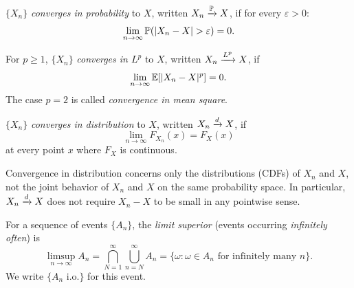 \documentclass[11pt,a4paper]{article}
\begin{document}
\begin{definition}
\label{def:prob_conv}
$\{X_n\}$ \emph{converges in probability} to $X$, written
$X_n \xrightarrow{\mathbb{P}} X$, if for every $\varepsilon > 0$:
\begin{equation}
  \lim_{n \to \infty} \mathbb{P}(|X_n - X| > \varepsilon) = 0.
  \label{eq:prob_conv}
\end{equation}
\end{definition}

\begin{definition}[Convergence in $L^p$]
\label{def:lp_conv}
For $p \geq 1$, $\{X_n\}$ \emph{converges in $L^p$} to $X$,
written $X_n \xrightarrow{L^{p}} X$, if
\begin{equation}
  \lim_{n \to \infty} \mathbb{E}\!\left[|X_n - X|^p\right] = 0.
  \label{eq:lp_conv}
\end{equation}
The case $p = 2$ is called \emph{convergence in mean square}.
\end{definition}

\begin{definition}
\label{def:dist_conv}
$\{X_n\}$ \emph{converges in distribution} to $X$, written
$X_n \xrightarrow{d} X$, if
\begin{equation}
  \lim_{n \to \infty} F_{X_n}(x) = F_X(x)
  \label{eq:dist_conv}
\end{equation}
at every point $x$ where $F_X$ is continuous.
\end{definition}

\begin{remark}
\label{rem:dist_weaker}
Convergence in distribution concerns only the distributions (CDFs)
of $X_n$ and $X$, not the joint behavior of $X_n$ and $X$ on the
same probability space.  In particular, $X_n \xrightarrow{d} X$ does not
require $X_n - X$ to be small in any pointwise sense.
\end{remark}

\begin{definition}
\label{def:limsup_events}
For a sequence of events $\{A_n\}$, the \emph{limit superior}
(events occurring \emph{infinitely often}) is
\begin{equation}
  \limsup_{n \to \infty} A_n
  = \bigcap_{N=1}^\infty \bigcup_{n=N}^\infty A_n
  = \{\omega : \omega \in A_n \text{ for infinitely many } n\}.
  \label{eq:limsup_events}
\end{equation}
We write $\{A_n \text{ i.o.}\}$ for this event.
\end{definition}
\end{document}

